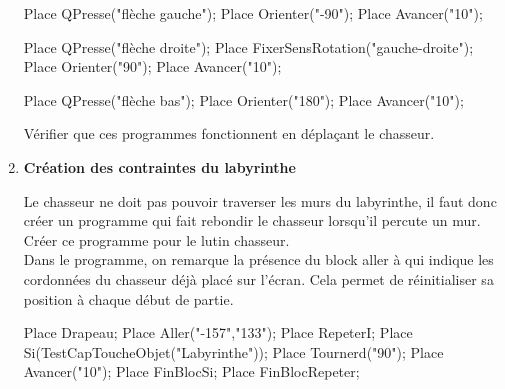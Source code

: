 \begin{changemargin}{-10mm}{-10mm}
\begin{enigme}
\begin{enumerate}
\begin{center}
      \begin{minipage}{0.3\linewidth}
         \begin{Scratch}[Echelle=0.75]
            Place QPresse("flèche gauche");
            Place Orienter("-90");
            Place Avancer("10");   
         \end{Scratch}
      \end{minipage}
      \hspace*{0.2\linewidth}
      \begin{minipage}{0.3\linewidth}
         \begin{Scratch}[Echelle=0.75]
            Place QPresse("flèche droite");
            Place FixerSensRotation("gauche-droite");
            Place Orienter("90");
            Place Avancer("10");   
         \end{Scratch}
      \end{minipage}

      \begin{Scratch}[Echelle=0.75]
         Place QPresse("flèche bas");
         Place Orienter("180");
         Place Avancer("10");         
      \end{Scratch}
      \end{center}
      Vérifier que ces programmes fonctionnent en déplaçant le chasseur.
 
      \pagebreak

      \item {\bf Création des contraintes du labyrinthe} \dotfill \\
      \begin{minipage}{0.6\linewidth}
         Le chasseur ne doit pas pouvoir traverser les murs du labyrinthe, il faut donc créer un programme qui fait \og rebondir \fg{} le chasseur lorsqu'il percute un mur. \\
         Créer ce programme pour le lutin chasseur. \\
         Dans le programme, on remarque la présence du block \textcolor{B1}{aller à} qui indique les cordonnées du chasseur déjà placé sur l'écran. Cela permet de réinitialiser sa position à chaque début de partie. \\
      \end{minipage}
      \qquad
      \begin{minipage}{0.3\linewidth}
         \begin{Scratch}[Echelle=0.7]
            Place Drapeau;
            Place Aller("-157","133");
            Place RepeterI;
               Place Si(TestCapToucheObjet("Labyrinthe"));
                  Place Tournerd("90");
                  Place Avancer("10");            
               Place FinBlocSi;
            Place FinBlocRepeter;
         \end{Scratch}
      \end{minipage}
   \end{enumerate}
 

\end{enigme}
\end{changemargin}
